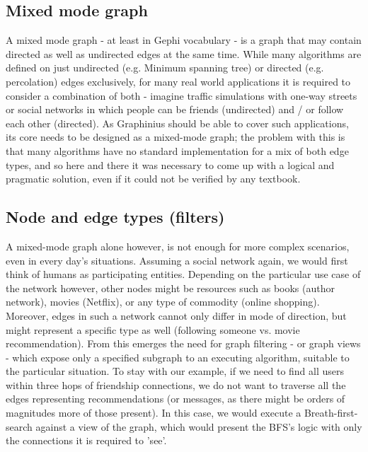	\subsection{Mixed mode graph}
	\label{ssect:mixedmode}
	A mixed mode graph - at least in Gephi vocabulary - is a graph that may contain directed as well as undirected edges at the same time. While many algorithms are defined on just undirected (e.g. Minimum spanning tree) or directed (e.g. percolation) edges exclusively, for many real world applications it is required to consider a combination of both - imagine traffic simulations with one-way streets or social networks in which people can be friends (undirected) and / or follow each other (directed). As Graphinius should be able to cover such applications, its core needs to be designed as a mixed-mode graph; the problem with this is that many algorithms have no standard implementation for a mix of both edge types, and so here and there it was necessary to come up with a logical and pragmatic solution, even if it could not be verified by any textbook.
	
	\subsection{Node and edge types (filters)}
	\label{ssect:node_types}	
	A mixed-mode graph alone however, is not enough for more complex scenarios, even in every day's situations. Assuming a social network again, we would first think of humans as participating entities. Depending on the particular use case of the network however, other nodes might be resources such as books (author network), movies (Netflix), or any type of commodity (online shopping). Moreover, edges in such a network cannot only differ in mode of direction, but might represent a specific type as well (following someone vs. movie recommendation). From this emerges the need for graph filtering - or graph views - which expose only a specified subgraph to an executing algorithm, suitable to the particular situation. To stay with our example, if we need to find all users within three hops of friendship connections, we do not want to traverse all the edges representing recommendations (or messages, as there might be orders of magnitudes more of those present). In this case, we would execute a Breath-first-search against a view of the graph, which would present the BFS's logic with only the connections it is required to 'see'.
	
	
